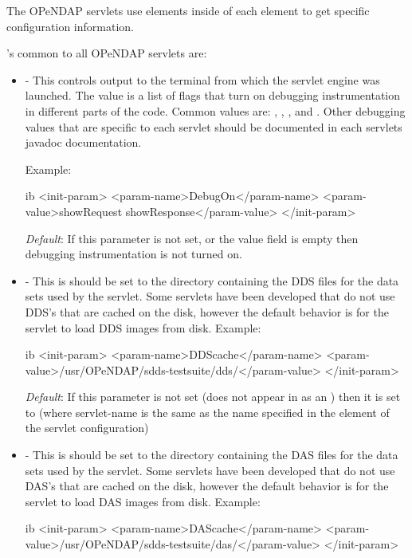 \documentclass{dods-book}
\begin{document}
The OPeNDAP servlets use  elements inside of each 
 element to get specific configuration information.

's common to all OPeNDAP servlets are:


\begin{itemize}

\item {} - This controls output to the terminal from which the servlet 
engine was launched. The value is a list of flags that turn on debugging 
instrumentation in different parts of the code. Common values are: , 
, , and . 
Other debugging values that are specific to each servlet should be documented 
in each servlets javadoc documentation. 

Example:
\begin{vcode}{ib}
    <init-param>
        <param-name>DebugOn</param-name>
         <param-value>showRequest showResponse</param-value>
    </init-param>
\end{vcode}
  
\emph{Default}: If this parameter is not set, or the value field is empty then 
debugging instrumentation is not turned on.


\item {} - This is should be set to the directory containing the DDS 
files for the data sets used by the servlet. Some servlets have been developed 
that do not use DDS's that are cached on the disk, however the default behavior 
is for the servlet to load DDS images from disk. 
Example:
\begin{vcode}{ib}
    <init-param>
        <param-name>DDScache</param-name>
        <param-value>/usr/OPeNDAP/sdds-testsuite/dds/</param-value>
    </init-param>
\end{vcode}

\emph{Default}: If this parameter is not set (does not appear in as an ) 
then it is set to  
(where servlet-name is the same as the name specified in the  
element of the servlet configuration)

\item {} - This is should be set to the directory containing the DAS files 
for the data sets used by the servlet. Some servlets have been developed that do 
not use DAS's that are cached on the disk, however the default behavior is for the 
servlet to load DAS images from disk. 
Example:
\begin{vcode}{ib}
    <init-param>
        <param-name>DAScache</param-name>
        <param-value>/usr/OPeNDAP/sdds-testsuite/das/</param-value>
    </init-param>
\end{vcode}


\end{itemize}
\end{document}
